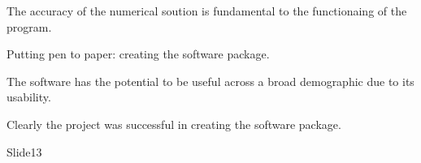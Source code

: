 \documentclass{beamer}
\begin{document}
\begin{frame}{The accuracy of the numerical soution is fundamental to the functionaing of the program.}
\end{frame}

\begin{frame}
\begin{center}
\color{darkgray}
\huge{Putting pen to paper: creating the software package.}
\end{center}
\end{frame}

\begin{frame}{The software has the potential to be useful across a broad demographic due to its usability.}
\end{frame}

\begin{frame}{Clearly the project was successful in creating the software package.}
\end{frame}

\begin{frame}{Slide13}
\end{frame}

\begin{frame}
  \titlepage
\end{frame}
\end{document}
